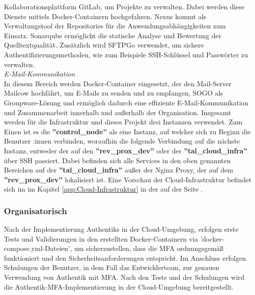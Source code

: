 Kollaborationsplattform GitLab, um Projekte zu verwalten. Dabei werden diese Dienste mittels Docker-Containern hochgefahren. 
Nexus kommt als Verwaltungstool der Repositories für die Anwendungsabhängigkeiten zum Einsatz. Sonarqube ermöglicht die 
statische Analyse und Bewertung der Quelltextqualität. Zusätzlich wird SFTPGo verwendet, um sichere Authentifizierungsmethoden, 
wie zum Beispiele SSH-Schlüssel und Passwörter zu verwalten.
\\\textit{E-Mail-Kommunikation}
\\In diesem Bereich werden Docker-Container eingesetzt, der den Mail-Server Mailcow hochfährt, um E-Mails zu senden und 
zu empfangen, SOGO als Groupware-Lösung und ermöglich dadurch eine effiziente E-Mail-Kommunikation und Zusammenarbeit innerhalb 
und außerhalb der Organisation.
Insgesamt werden für die Infrastruktur und dieses Projekt drei Instanzen verwendet. Zum Einen ist es die \textbf{''control\_node''} 
als eine Instanz, auf welcher sich zu Beginn die Benutzer :innen verbinden, woraufhin die folgende Verbindung auf die nächste Instanz, 
entweder der auf den \textbf{''rev\_prox\_dev''} oder der \textbf{''tal\_cloud\_infra''} über SSH passiert. Dabei befinden 
sich alle Services in den oben genannten Bereichen auf der \textbf{''tal\_cloud\_infra''} außer 
der Nginx Proxy, der auf dem \textbf{''rev\_prox\_dev''} lokalisiert ist. Eine Vorschau der Cloud-Infrastruktur befindet 
sich im  im Kapitel \ref{app:Cloud-Infrastruktur} in der  auf der Seite 
\pageref{app:Cloud-Infrastruktur}.

\subsubsection{Organisatorisch}
\label{sec:Organisatorisch}
Nach der Implementierung Authentiks in der Cloud-Umgebung, erfolgen erste Tests und Validierungen in den erstellten 
Docker-Containern via 'docker-compose.yml-Dateien', um sicherzustellen, dass die MFA ordnungsgemäß funktioniert und den 
Sicherheitsanforderungen entspricht. 
Im Anschluss erfolgen Schulungen der Benutzer, in dem Fall das Entwicklerteam, zur genauen Verwendung von Authentik mit MFA. 
Nach den Tests und der Schulungen wird die Authentik-MFA-Implementierung in der Cloud-Umgebung bereitgestellt.


